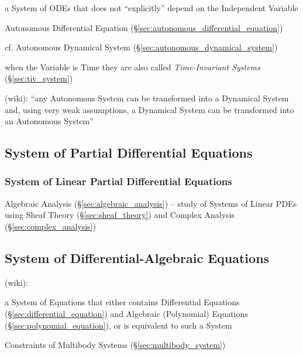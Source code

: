 a System of ODEs that does not ``explicitly'' depend on the Independent Variable

Autonomous Differential Equation (\S\ref{sec:autonomous_differential_equation})

cf. Autonomous Dynamical System (\S\ref{sec:autonomous_dynamical_system})

when the Variable is Time they are also called \emph{Time-Invariant Systems}
(\S\ref{sec:tiv_system})

(wiki): ``any Autonomous System can be transformed into a Dynamical System and,
using very weak assumptions, a Dynamical System can be transformed into an
Autonomous System''



\subsection{System of Partial Differential Equations}\label{sec:pde_system}

\subsubsection{System of Linear Partial Differential Equations}
\label{sec:linear_pde_system}

\fist Algebraic Analysis (\S\ref{sec:algebraic_analysis}) -- study of Systems of
Linear PDEs using Sheaf Theory (\S\ref{sec:sheaf_theory}) and Complex Analysis
(\S\ref{sec:complex_analysis})



\subsection{System of Differential-Algebraic Equations}\label{sec:dae_system}

(wiki):

a System of Equations that either contains Differential Equations
(\S\ref{sec:differential_equation}) and Algebraic (Polynomial) Equations
(\S\ref{sec:polynomial_equation}), or is equivalent to such a System

\fist Constraints of Multibody Systems (\S\ref{sec:multibody_system})

